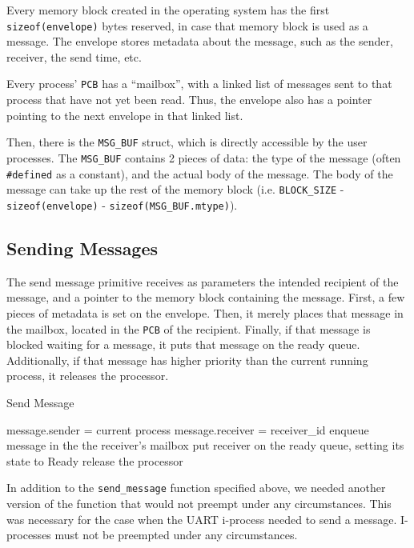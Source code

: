 \documentclass[12pt]{report}
\begin{document}
Every memory block created in the operating system has the first \texttt{sizeof(envelope)} bytes reserved, in case that memory block is used as a message. The envelope stores metadata about the message, such as the sender, receiver, the send time, etc. 

Every process' \texttt{PCB} has a ``mailbox'', with a linked list of messages sent to that process that have not yet been read. Thus, the envelope also has a pointer pointing to the next envelope in that linked list.

Then, there is the \texttt{MSG_BUF} struct, which is directly accessible by the user processes. The \texttt{MSG_BUF} contains 2 pieces of data: the type of the message (often \texttt{\#defined} as a constant), and the actual body of the message. The body of the message can take up the rest of the memory block (i.e. \texttt{BLOCK_SIZE} - \texttt{sizeof(envelope)} - \texttt{sizeof(MSG_BUF.mtype)}). 


\subsection{Sending Messages}

The send message primitive receives as parameters the intended recipient of the message, and a pointer to the memory block containing the message. First, a few pieces of metadata is set on the envelope. Then, it merely places that message in the mailbox, located in the \texttt{PCB} of the recipient. Finally, if that message is blocked waiting for a message, it puts that message on the ready queue. Additionally, if that message has higher priority than the current running process, it releases the processor.

\begin{algorithm}[H]
	\caption{Send Message}
	\begin{algorithmic}[1]
			\State message.sender = current process
			\State message.receiver = receiver_id
			\State enqueue message in the the receiver's mailbox
				\State put receiver on the ready queue, setting its state to Ready
					\State release the processor
				\EndIf
			\EndIf
		\EndFunction
	\end{algorithmic}
\end{algorithm}

In addition to the \texttt{send_message} function specified above, we needed another version of the function that would not preempt under any circumstances. This was necessary for the case when the UART i-process needed to send a message. I-processes must not be preempted under any circumstances.
\end{document}
